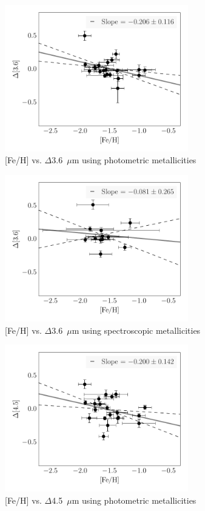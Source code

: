 \documentclass[a4paper,fleqn,usenatbib]{mnras}
\begin{document}
\begin{figure}
\begin{center}
\includegraphics[width=80mm]{final_plots/delta_feh_3p6_phot.pdf}
\caption{[Fe/H] vs. $\Delta$3.6~$\mu$m using photometric metallicities}
\label{fig:delta_3p6_phot}
\end{center}
\end{figure}

\begin{figure}
\begin{center}
\includegraphics[width=80mm]{final_plots/delta_feh_3p6_spect.pdf}
\caption{[Fe/H] vs. $\Delta$3.6~$\mu$m using spectroscopic metallicities}
\label{fig:delta_3p6_spect}
\end{center}
\end{figure}

\begin{figure}
\begin{center}
\includegraphics[width=80mm]{final_plots/delta_feh_4p5_phot.pdf}
\caption{[Fe/H] vs. $\Delta$4.5~$\mu$m using photometric metallicities}
\label{fig:delta_4p5_phot}
\end{center}
\end{figure}
\end{document}
